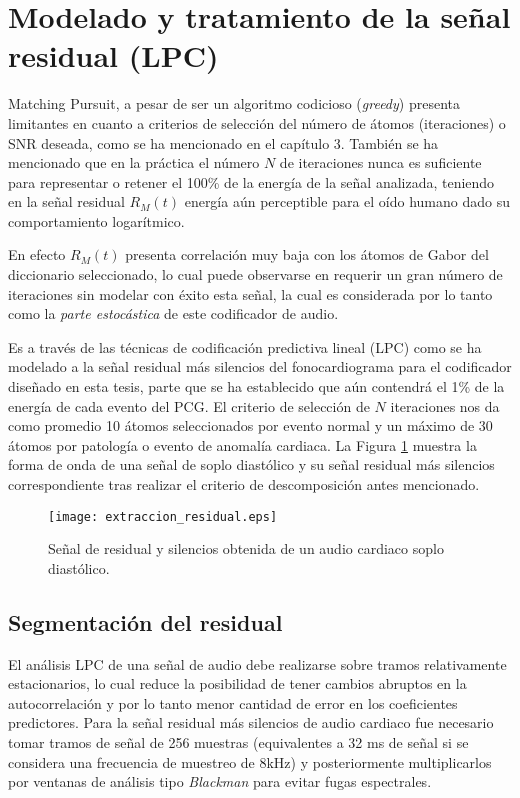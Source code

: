 




\section{Modelado y tratamiento de la señal residual (LPC)}

Matching Pursuit, a pesar de ser un algoritmo codicioso (\emph{greedy}) presenta limitantes en cuanto a criterios de selección del número de átomos (iteraciones) o SNR deseada, como se ha mencionado en el capítulo 3. También se ha mencionado que en la práctica el número $N$ de iteraciones nunca es suficiente para representar o retener el 100\% de la energía de la señal analizada, teniendo en la señal residual $R_{M}(t)$ energía aún perceptible para el oído humano dado su comportamiento logarítmico.

En efecto $R_{M}(t)$ presenta correlación muy baja con los átomos de Gabor del diccionario seleccionado, lo cual puede observarse en requerir un gran número de iteraciones sin modelar con éxito esta señal, la cual es considerada por lo tanto como la \emph{parte estocástica} de este codificador de audio.

Es a través de las técnicas de codificación predictiva lineal (LPC) como se ha modelado a la señal residual más silencios del fonocardiograma para el codificador diseñado en esta tesis, parte que se ha establecido que aún contendrá el 1\% de la energía de cada evento del PCG. El criterio de selección de $N$ iteraciones nos da como promedio 10 átomos seleccionados por evento normal y un máximo de 30 átomos por patología o evento de anomalía cardiaca. La Figura \ref{residual} muestra la forma de onda de una señal de soplo diastólico y su señal residual más silencios correspondiente tras realizar el criterio de descomposición antes mencionado.
\begin{figure}[ht]
  \centering
  \texttt{[image: extraccion\_residual.eps]}
  \caption{Señal de residual y silencios obtenida de un audio cardiaco soplo diastólico.}
  \label{residual}
\end{figure}
\subsection{Segmentación del residual}
El análisis LPC de una señal de audio debe realizarse sobre tramos relativamente estacionarios, lo cual reduce la posibilidad de tener cambios abruptos en la autocorrelación y por lo tanto menor cantidad de error en los coeficientes predictores.
Para la señal residual más silencios de audio cardiaco fue necesario tomar tramos de señal de 256 muestras (equivalentes a 32 ms de señal si se considera una frecuencia de muestreo de 8kHz) y posteriormente multiplicarlos por ventanas de análisis tipo \emph{Blackman} para evitar fugas espectrales. 


